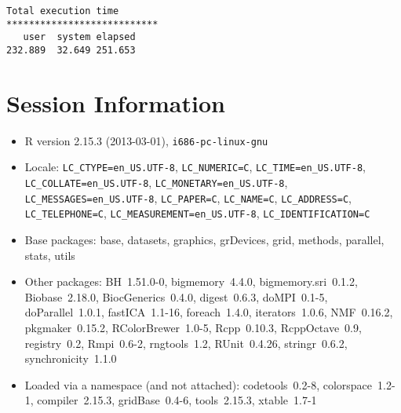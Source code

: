 \documentclass[10pt]{article}
\begin{document}
\begin{verbatim}
Total execution time
***************************
   user  system elapsed 
232.889  32.649 251.653 

\end{verbatim}

\section*{Session Information}
\begin{itemize}\raggedright
  \item R version 2.15.3 (2013-03-01), \verb|i686-pc-linux-gnu|
  \item Locale: \verb|LC_CTYPE=en_US.UTF-8|, \verb|LC_NUMERIC=C|, \verb|LC_TIME=en_US.UTF-8|, \verb|LC_COLLATE=en_US.UTF-8|, \verb|LC_MONETARY=en_US.UTF-8|, \verb|LC_MESSAGES=en_US.UTF-8|, \verb|LC_PAPER=C|, \verb|LC_NAME=C|, \verb|LC_ADDRESS=C|, \verb|LC_TELEPHONE=C|, \verb|LC_MEASUREMENT=en_US.UTF-8|, \verb|LC_IDENTIFICATION=C|
  \item Base packages: base, datasets, graphics, grDevices, grid,
    methods, parallel, stats, utils
  \item Other packages: BH~1.51.0-0, bigmemory~4.4.0,
    bigmemory.sri~0.1.2, Biobase~2.18.0, BiocGenerics~0.4.0,
    digest~0.6.3, doMPI~0.1-5, doParallel~1.0.1, fastICA~1.1-16,
    foreach~1.4.0, iterators~1.0.6, NMF~0.16.2, pkgmaker~0.15.2,
    RColorBrewer~1.0-5, Rcpp~0.10.3, RcppOctave~0.9, registry~0.2,
    Rmpi~0.6-2, rngtools~1.2, RUnit~0.4.26, stringr~0.6.2,
    synchronicity~1.1.0
  \item Loaded via a namespace (and not attached): codetools~0.2-8,
    colorspace~1.2-1, compiler~2.15.3, gridBase~0.4-6, tools~2.15.3,
    xtable~1.7-1
\end{itemize}
\end{document}
